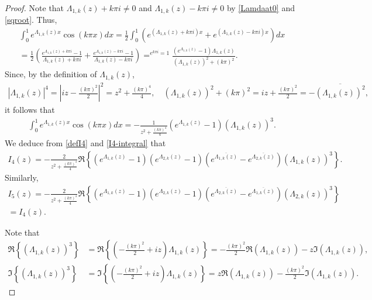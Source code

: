 \documentclass[11pt, reqno]{amsart}
\theoremstyle{plain}
\numberwithin{equation}{section}
\begin{document}
\begin{proof} Note that $\Lambda_{1,k}(z) + k \pi i \neq 0$ and $\Lambda_{1,k}(z) - k \pi i \neq 0$ by \eqref{Lamdaat0} and \eqref{sqroot}. Thus,
    \begin{multline*}
        \int_0^1 e^{\Lambda_{1,k}(z) x} \cos(k \pi x)  dx = \frac{1}{2} \int_0^1 \left(e^{(\Lambda_{1,k}(z) + k \pi i) x} + e^{(\Lambda_{1,k}(z) - k \pi i) x} \right) dx  \\
        = \frac{1}{2} \left(\frac{e^{\Lambda_{1,k}(z) + k \pi i} - 1}{\Lambda_{1,k}(z) + k \pi i} + \frac{e^{\Lambda_{1,k}(z) - k \pi i} - 1}{\Lambda_{1,k}(z) - k \pi i} \right) \mathop{=}^{e^{k \pi i} = 1} \frac{\left(e^{\Lambda_{1,k}(z)} - 1 \right) \Lambda_{1,k}(z) }{(\Lambda_{1,k}(z))^2 + (k \pi)^2}. 
    \end{multline*}
    Since, by the definition of $\Lambda_{1,k}(z)$, 
    \begin{align*}
   |\Lambda_{1,k}(z)|^4 = \left|iz - \frac{(k \pi)^2}{2} \right|^2 = z^2 + \frac{(k \pi)^4}{4}, \quad      (\Lambda_{1,k}(z))^2 + (k \pi)^2 = iz + \frac{(k \pi)^2}{2} = - \overline{(\Lambda_{1,k}(z))^2},  
    \end{align*}
it follows that    
\begin{align}	\label{I4-integral}
    	\int_0^1 e^{\Lambda_{1,k}(z) x} \cos(k \pi x) dx = - \frac{1}{z^2 + \frac{(k \pi)^4}{4}} \left(e^{\Lambda_{1,k}(z)} - 1 \right) \left(\Lambda_{1,k}(z) \right)^3.  
    \end{align}
    We deduce from \eqref{defI4} and \eqref{I4-integral} that 
    \begin{align}
        I_4(z) = - \frac{ 2}{z^2 + \frac{(k \pi)^4}{4}}\Re \left\{  \left(e^{\Lambda_{1,k}(z)} - 1 \right) \left(e^{\Lambda_{2,k}(z)} - 1 \right) \left(e^{\overline{\Lambda_{1,k}(z)}} - e^{\overline{\Lambda_{2,k}(z)}} \right) \left(\Lambda_{1,k}(z) \right)^3 \right\}. 	\label{I4-step1}
    \end{align}
    Similarly,
    \begin{multline}  	\label{I5-step1}
        I_5(z) = -\frac{ 2}{z^2 + \frac{(k \pi)^4}{4}}\Re \left\{ \left(e^{\Lambda_{1,k}(z)} - 1 \right)  \left(e^{\Lambda_{2,k}(z)} - 1 \right)\left(e^{\overline{\Lambda_{2,k}(z)}} - e^{\overline{\Lambda_{1,k}(z)}} \right) \left(\Lambda_{2,k}(z) \right)^3 \right\}  \\ 
        = I_4(z).
    \end{multline}  

  	Note that 
    \begin{align}
       \Re \left\{ \left(\Lambda_{1,k}(z) \right)^3 \right\} &= \Re \left\{\left(-\frac{(k \pi)^2}{2} + iz \right) \Lambda_{1,k}(z) \right\} = - \frac{(k \pi)^2}{2}\Re (\Lambda_{1,k}(z)) - z \Im (\Lambda_{1,k}(z)), \label{I4-step3.1}\\
        \Im \left\{ \left(\Lambda_{1,k}(z) \right)^3 \right\} &=  \Im \left\{\left(-\frac{(k \pi)^2}{2} + iz \right) \Lambda_{1,k}(z) \right\} = z\Re (\Lambda_{1,k}(z)) - \frac{(k \pi)^2}{2} \Im (\Lambda_{1,k}(z)). 	\label{I4-step3.2}
    \end{align}
        

\end{proof}
\end{document}
